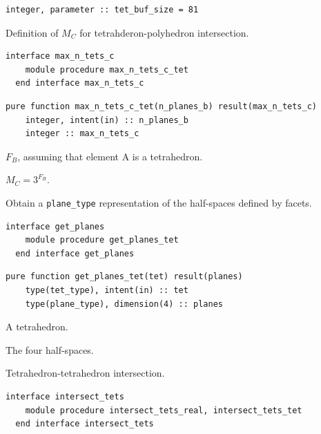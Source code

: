 \documentclass{article}
\begin{document}
\begin{lstlisting}[language=FORTRAN]
  integer, parameter :: tet_buf_size = 81
\end{lstlisting}

\noindent Definition of $M_C$ for tetrahderon-polyhedron intersection.

\begin{lstlisting}[language=FORTRAN]
  interface max_n_tets_c
    module procedure max_n_tets_c_tet
  end interface max_n_tets_c
\end{lstlisting}

\begin{lstlisting}[language=FORTRAN]
  pure function max_n_tets_c_tet(n_planes_b) result(max_n_tets_c)
    integer, intent(in) :: n_planes_b    
    integer :: max_n_tets_c
\end{lstlisting}

\begin{description}[font=\ttfamily\bfseries,leftmargin=2.2\parindent,labelindent=1.7\parindent,noitemsep]
  \item[n\_planes\_b] $F_B$, assuming that element A is a tetrahedron.
  \item[max\_n\_tets\_c] $M_C = 3^{F_B}$.
\end{description}

\noindent Obtain a \verb+plane_type+ representation of the half-spaces defined
by facets.

\begin{lstlisting}[language=FORTRAN]
  interface get_planes
    module procedure get_planes_tet
  end interface get_planes
\end{lstlisting}
  
\begin{lstlisting}[language=FORTRAN]
  pure function get_planes_tet(tet) result(planes)
    type(tet_type), intent(in) :: tet
    type(plane_type), dimension(4) :: planes
\end{lstlisting}

\begin{description}[font=\ttfamily\bfseries,leftmargin=2.2\parindent,labelindent=1.7\parindent,noitemsep]
  \item[tet] A tetrahedron.
  \item[plane] The four half-spaces.
\end{description}

\noindent Tetrahedron-tetrahedron intersection.

\begin{lstlisting}[language=FORTRAN]
  interface intersect_tets
    module procedure intersect_tets_real, intersect_tets_tet
  end interface intersect_tets
\end{lstlisting}
\end{document}
